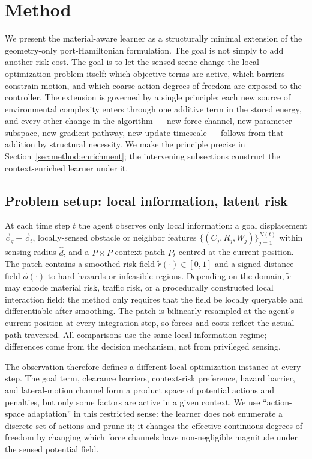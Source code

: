 \section{Method}
\label{sec:method}

We present the material-aware learner as a structurally minimal
extension of the geometry-only port-Hamiltonian formulation. The goal is
not simply to add another risk cost. The goal is to let the sensed scene
change the local optimization problem itself: which objective terms are
active, which barriers constrain motion, and which coarse action degrees
of freedom are exposed to the controller. The extension is governed by a
single principle: each new source of environmental complexity enters
through one additive term in the stored energy, and every other change in
the algorithm — new force channel, new parameter subspace, new gradient
pathway, new update timescale — follows from that addition by structural
necessity. We make the principle precise in
Section~\ref{sec:method:enrichment}; the intervening subsections
construct the context-enriched learner under it.

\subsection{Problem setup: local information, latent risk}
\label{sec:method:setup}

At each time step $t$ the agent observes only local information: a goal
displacement $\vec{c}_g - \vec{c}_t$, locally-sensed obstacle or neighbor
features $\{(C_j, R_j, W_j)\}_{j=1}^{N(t)}$ within sensing radius $\hat
d$, and a $P{\times}P$ context patch $P_t$ centred at the current
position. The patch contains a smoothed risk field
$\tilde r(\cdot)\in[0,1]$ and a signed-distance field $\phi(\cdot)$ to
hard hazards or infeasible regions. Depending on the domain,
$\tilde r$ may encode material risk, traffic risk, or a procedurally
constructed local interaction field; the method only requires that the
field be locally queryable and differentiable after smoothing. The patch
is bilinearly resampled at the agent's current position at every
integration step, so forces and costs reflect the actual path traversed.
All comparisons use the same local-information regime; differences come
from the decision mechanism, not from privileged sensing.

The observation therefore defines a different local optimization
instance at every step. The goal term, clearance barriers,
context-risk preference, hazard barrier, and lateral-motion channel form
a product space of potential actions and penalties, but only some
factors are active in a given context. We use ``action-space adaptation''
in this restricted sense: the learner does not enumerate a discrete set
of actions and prune it; it changes the effective continuous degrees of
freedom by changing which force channels have non-negligible magnitude
under the sensed potential field.

